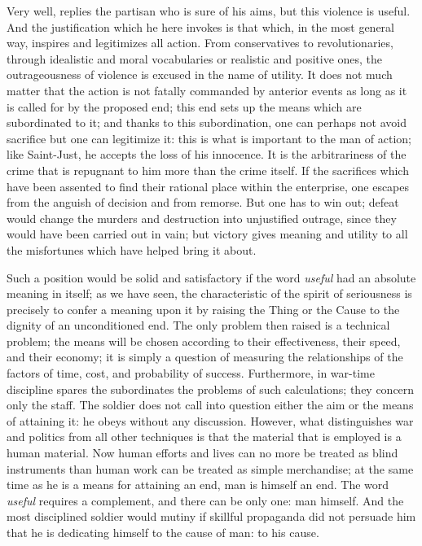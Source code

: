 \documentclass[11pt]{article}
\begin{document}
{{Very well, replies the partisan who is sure of his aims, but this violence is useful. And the justification which he here invokes is that which, in the most general way, inspires and legitimizes all action. From conservatives to revolutionaries, through idealistic and moral vocabularies or realistic and positive ones, the outrageousness of violence is excused in the name of utility. It does not much matter that the action is not fatally commanded by anterior events as long as it is called for by the proposed end; this end sets up the means which are subordinated to it; and thanks to this subordination, one can perhaps not avoid sacrifice but one can legitimize it: this is what is important to the man of action; like Saint-Just, he accepts the loss of his innocence. It is the arbitrariness of the crime that is repugnant to him more than the crime itself. If the sacrifices which have been assented to find their rational place within the enterprise, one escapes from the anguish of decision and from remorse. But one has to win out; defeat would change the murders and destruction into unjustified outrage, since they would have been carried out in vain; but victory gives meaning and utility to all the misfortunes which have helped bring it about.

Such a position would be solid and satisfactory if the word \textit{useful} had an absolute meaning in itself; as we have seen, the characteristic of the spirit of seriousness is precisely to confer a meaning upon it by raising the Thing or the Cause to the dignity of an unconditioned end. The only problem then raised is a technical problem; the means will be chosen according to their effectiveness, their speed, and their economy; it is simply a question of measuring the relationships of the factors of time, cost, and probability of success. Furthermore, in war-time discipline spares the subordinates the problems of such calculations; they concern only the staff. The soldier does not call into question either the aim or the means of attaining it: he obeys without any discussion. However, what distinguishes war and politics from all other techniques is that the material that is employed is a human material. Now human efforts and lives can no more be treated as blind instruments than human work can be treated as simple merchandise; at the same time as he is a means for attaining an end, man is himself an end. The word \textit{useful} requires a complement, and there can be only one: man himself. And the most disciplined soldier would mutiny if skillful propaganda did not persuade him that he is dedicating himself to the cause of man: to his cause.

}}
\end{document}
